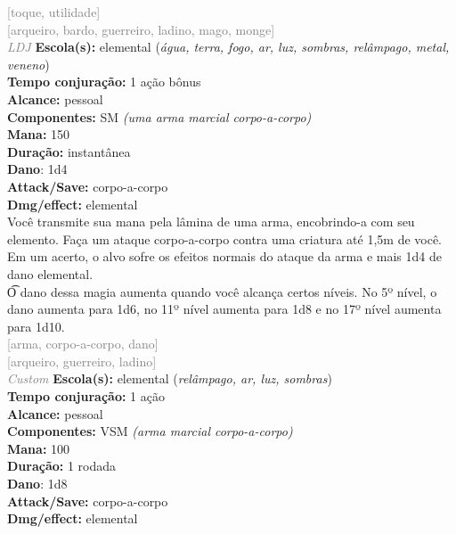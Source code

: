 \documentclass{RPG_Adventure}[2021/10/20]
\begin{document}
{\scriptsize \textcolor{gray}{[toque, utilidade]\\}}
{\scriptsize \textcolor{gray}{[arqueiro, bardo, guerreiro, ladino, mago, monge]\\}}
{\tiny \textcolor{gray}{\textit{LDJ}}}\jump{}
{\small \t \textbf{Escola(s):} elemental (\textit{água, terra, fogo, ar, luz, sombras, relâmpago, metal, veneno})\\\t \textbf{Tempo conjuração:} 1 ação bônus\\\t \textbf{Alcance:} pessoal\\\t \textbf{Componentes:} SM \textit{(uma arma marcial corpo-a-corpo)}\\\t \textbf{Mana:} 150\\\t \textbf{Duração:} instantânea\\\t \textbf{Dano}: 1d4\\\t \textbf{Attack/Save:} corpo-a-corpo\\\t \textbf{Dmg/effect:} elemental\\}
{\normalsize Você transmite sua mana pela lâmina de uma arma, encobrindo-a com seu elemento. Faça um ataque corpo-a-corpo contra uma criatura até 1,5m de você. Em um acerto, o alvo sofre os efeitos normais do ataque da arma e mais 1d4 de dano elemental.\\\t O dano dessa magia aumenta quando você alcança certos níveis. No 5º nível, o dano aumenta para 1d6, no 11º nível aumenta para 1d8 e no 17º nível aumenta para 1d10.\\}
{\scriptsize \textcolor{gray}{[arma, corpo-a-corpo, dano]\\}}
{\scriptsize \textcolor{gray}{[arqueiro, guerreiro, ladino]\\}}
{\tiny \textcolor{gray}{\textit{Custom}}}\jump{}
{\small \t \textbf{Escola(s):} elemental (\textit{relâmpago, ar, luz, sombras})\\\t \textbf{Tempo conjuração:} 1 ação\\\t \textbf{Alcance:} pessoal\\\t \textbf{Componentes:} VSM \textit{(arma marcial corpo-a-corpo)}\\\t \textbf{Mana:} 100\\\t \textbf{Duração:} 1 rodada\\\t \textbf{Dano}: 1d8\\\t \textbf{Attack/Save:} corpo-a-corpo\\\t \textbf{Dmg/effect:} elemental\\}
\end{document}
